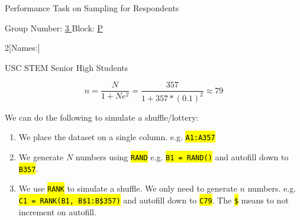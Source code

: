 \documentclass[answers, 12pt]{exam}
\begin{document}
{\centering Performance Task on Sampling for Respondents\par}
Group Number: \underline{ 3 } 
Block: \underline{ P }


\begin{multicols}{2}[Names:]
  \newcommand\longunderline[1]{\uline{\hspace*{0.1cm}#1\hfill}}
  \authors{\longunderline}
\end {multicols}

\renewcommand{\thequestion}{\Alph{question}}
\unframedsolutions
\renewcommand{\solutiontitle}{\vspace{-0.20in}}
\begin {questions}
  \begin{solution}
    \researchtitle
  \end {solution}

  \begin {solution}
    USC STEM Senior High Students
  \end{solution}

  \begin {solution}
    \[n = \frac{N}{1+Ne^2} = \frac{357}{1 + 357*(0.1)^2} \approx 79\]
  \end {solution}
  \begin {solution}
    \newcommand{\code}[1]{\hl{\texttt{#1}}}
    We can do the following to simulate a shuffle/lottery:
    \begin{enumerate}
    \item We place the dataset on a single column. e.g. \code{A1:A357}
      
    \item We generate \(N\) numbers using \code{RAND} e.g. \code{B1 = RAND()} and
      autofill down to \code{B357}.

    \item We use \code{RANK} to simulate a shuffle. We only need to generate
      \(n\) numbers. e.g.\\\code{C1 = RANK(B1, B\$1:B\$357)} and autofill down to
      \code{C79}. The \code{\$} means to not increment on autofill.


\end{enumerate}
\end{solution}
\end{questions}
\end{document}
